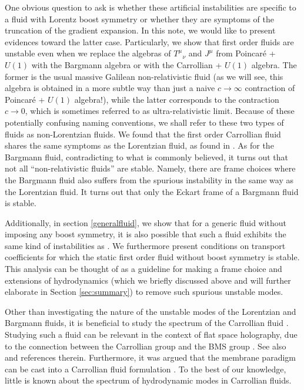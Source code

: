 \documentclass[superscriptaddress,prd,nofootinbib,preprintnumbers,longbibliography,11pt,eqsecnum]{revtex4-1}
\begin{document}
 One obvious question to ask is  whether these artificial instabilities are specific to a fluid with Lorentz boost symmetry or whether they are symptoms of the truncation of the gradient expansion. In this note, we would like to present evidences toward the latter case. 
 Particularly, we show that first order fluids are unstable even when we replace the algebras of $T^{\mu}_{\;\;\,\nu}$ and $J^\mu$ from Poincar\'e + $U(1)$ with the Bargmann algebra or with the Carrollian + $U(1)$ algebra. The former is the usual massive Galilean non-relativistic fluid (as we will see, this algebra is obtained in a more subtle way than just a naive $c \to \infty$ contraction of Poincar\'e + $U(1)$ algebra!), while the latter corresponds to the contraction $c\to 0$, which is sometimes referred to as ultra-relativistic limit. Because of these potentially confusing naming conventions, we shall refer to these two types of fluids as non-Lorentzian fluids. We found that the first order Carrollian fluid shares the same symptoms as the Lorentzian fluid, as found in \cite{Hiscock:1985zz}. As for the Bargmann fluid, contradicting to what is commonly believed, it turns out that not all ``non-relativistic fluids'' are stable. Namely, there are frame choices where the Bargmann fluid also suffers from the spurious instability in the same way as the Lorentzian fluid. It turns out that only the Eckart frame of a Bargmann fluid is stable.

Additionally, in section \ref{generalfluid}, we show that for a generic fluid without imposing any boost symmetry, it is also possible that such a fluid exhibits the same kind of instabilities as \cite{Hiscock:1985zz}. We furthermore present conditions on transport coefficients for which the static first order fluid without boost symmetry is stable. This analysis can be thought of as a guideline for making a frame choice and extensions of hydrodynamics (which we briefly discussed above and will further elaborate in Section \ref{sec:summary}) to remove such spurious unstable modes.

 Other than investigating the nature of the unstable modes of the Lorentzian and Bargmann fluids, it is beneficial to study the spectrum of the Carrollian fluid \cite{Ciambelli:2018wre,Ciambelli:2018xat,deBoer:2017ing}. Studying such a fluid can be relevant in the context of flat space holography, due to the connection between the Carrollian group and the BMS group \cite{Duval:2014uva,Duval:2014uoa}. See also \cite{Bagchi:2016bcd} and references therein. Furthermore, it was argued that the membrane paradigm can be cast into a Carrollian fluid formulation \cite{Donnay:2019jiz}. To the best of our knowledge, little is known about the spectrum of hydrodynamic modes in Carrollian fluids.  
\end{document}
